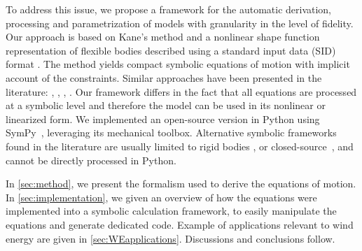 \documentclass[wes, manuscript]{copernicus}
\begin{document}

To address this issue, we propose a framework for the automatic derivation, processing and
parametrization of models with granularity in the level of fidelity.
Our approach is based on Kane’s method \citep{kane:1965} and a nonlinear shape function representation of flexible bodies \citep{shabana:book}
 described using a standard input data (SID) format \citep{Wallrapp:1994, Schwertassek:book}.
The method yields compact symbolic equations of motion with implicit account of the constraints. 
Similar approaches have been presented in the literature: \cite{Kurtz:2009}, \cite{Merz:2018}, \cite{Lemmer:2018}, \cite{branlard:2019flex}.
Our framework differs in the fact that all equations are processed at a symbolic level and therefore the model can be used in its nonlinear or linearized form. 
We implemented an open-source version in Python using SymPy~\citep{sympy},  leveraging its mechanical toolbox.
Alternative symbolic frameworks found in the literature are usually limited to rigid bodies \citep{Verlinden:2005,Kurtz:2009,Gede:2013,Docquier:2013}, or closed-source~\citep{Autolev,NeweulM2,MotionGenesis}, and cannot be directly processed in Python. 




In \autoref{sec:method}, we present the formalism used to derive the equations of motion. 
    In \autoref{sec:implementation}, we given an overview of how the equations were implemented into a symbolic calculation framework, to easily manipulate the equations and generate dedicated code. 
Example of applications relevant to wind energy are given in \autoref{sec:WEapplications}.
Discussions and conclusions follow.
\end{document}
